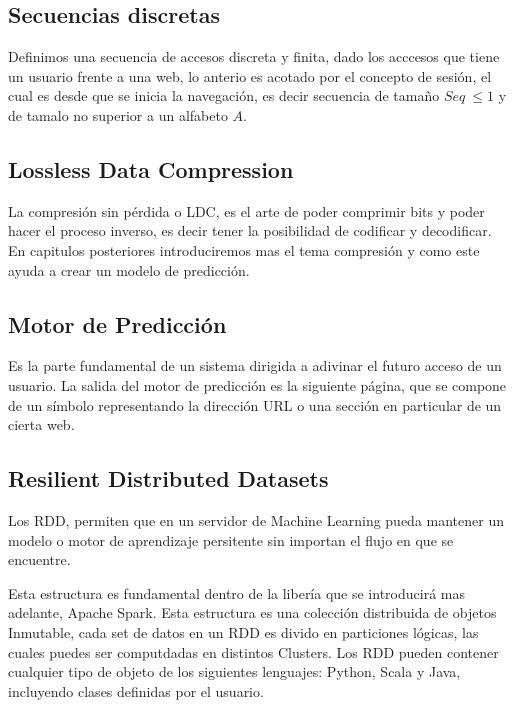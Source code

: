 \subsection{Secuencias discretas}

Definimos una secuencia de accesos discreta y finita, dado los acccesos que tiene un usuario frente a una web, lo anterio es acotado por el concepto de sesión, el cual es desde que se inicia la navegación, es decir secuencia de tamaño $Seq\ \leq 1$ y de tamalo no superior a un alfabeto $A$.


\subsection{Lossless Data Compression}

La compresión sin pérdida o LDC, es el arte de poder comprimir bits y poder hacer el proceso inverso, es decir tener la posibilidad de codificar y decodificar. En capitulos posteriores introduciremos mas el tema compresión y como este ayuda a crear un modelo de predicción.


\subsection{Motor de Predicción}

Es la parte fundamental de un sistema dirigida a adivinar el futuro acceso de un usuario. La salida del motor de predicción es la siguiente página, que se compone de un símbolo representando la dirección URL o una sección en particular de un cierta web. 



\subsection{Resilient Distributed Datasets }

	Los RDD, permiten que en un servidor de Machine Learning pueda mantener un modelo o motor de aprendizaje persitente sin importan el flujo en que se encuentre.

	Esta estructura es fundamental dentro de la libería que se introducirá mas adelante, Apache Spark. Esta estructura es una colección distribuida de objetos Inmutable, cada 
	set de datos en un RDD es divido en particiones lógicas, las cuales puedes ser computdadas en distintos Clusters. Los RDD pueden contener cualquier tipo de objeto de los siguientes lenguajes: Python, Scala y Java, incluyendo clases definidas por el usuario. 

